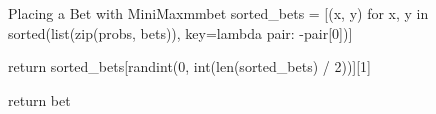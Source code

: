 \begin{appendices}
\begin{myminted}{Placing a Bet with MiniMax}{mmbet}
                    sorted_bets = [(x, y) for x, y in sorted(list(zip(probs, bets)), key=lambda pair: -pair[0])]

                    return sorted_bets[randint(0, int(len(sorted_bets) / 2))][1]

                return bet
    \end{myminted}
\end{appendices}
